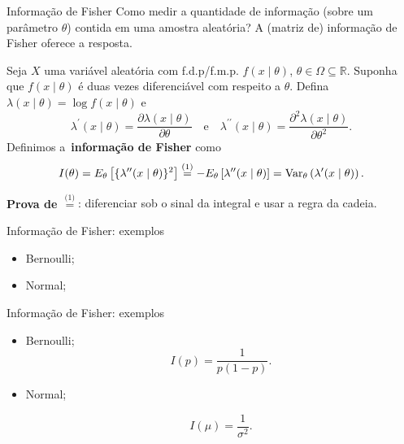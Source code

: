\begin{frame}{Informação de Fisher}
Como medir a quantidade de informação (sobre um parâmetro $\theta$) contida em uma amostra aleatória?
A (matriz de) informação de Fisher oferece a resposta.
\begin{defn}
 \label{def:Fisher_information}
 Seja $X$ uma variável aleatória com f.d.p/f.m.p. $f(x\mid\theta)$, $\theta \in \Omega \subseteq \mathbb{R}$.
 Suponha que $f(x\mid\theta)$ é duas vezes diferenciável com respeito a $\theta$.
 Defina $\lambda(x\mid \theta) = \log f(x\mid\theta)$ e 
 \begin{equation}
  \lambda^\prime(x\mid \theta) = \frac{\partial \lambda(x\mid \theta)}{\partial \theta}\quad\text{e}\quad \lambda^{\prime\prime}(x\mid \theta) = \frac{\partial^2 \lambda(x\mid \theta)}{\partial \theta^2}.
 \end{equation}
Definimos a~\textbf{informação de Fisher} como
\begin{equation}
 \label{eq:Fisher_information}
 I(\theta) = E_\theta\left[\{\lambda^{\prime\prime}(x\mid \theta)\}^2\right] \stackrel{\text{(1)}}{=} -E_\theta\left[\lambda^{\prime\prime}(x\mid \theta)\right] = \operatorname{Var}_\theta\left(\lambda^{\prime}(x\mid \theta) \right).
\end{equation}
\end{defn}
\textbf{Prova de $\stackrel{\text{(1)}}{=}$}: diferenciar sob o sinal da integral e usar a regra da cadeia.
\end{frame}

\begin{frame}{Informação de Fisher: exemplos}
 \begin{itemize}
  \item Bernoulli;
  \item Normal;
 \end{itemize}

\end{frame}

\begin{frame}{Informação de Fisher: exemplos}
 \begin{itemize}
  \item Bernoulli;
  \begin{equation*}
   I(p) = \frac{1}{p(1-p)}.
  \end{equation*}
  
  \item Normal;
  
  \begin{equation*}
  I(\mu) = \frac{1}{\sigma^2}.
  \end{equation*}
 \end{itemize}

\end{frame}

